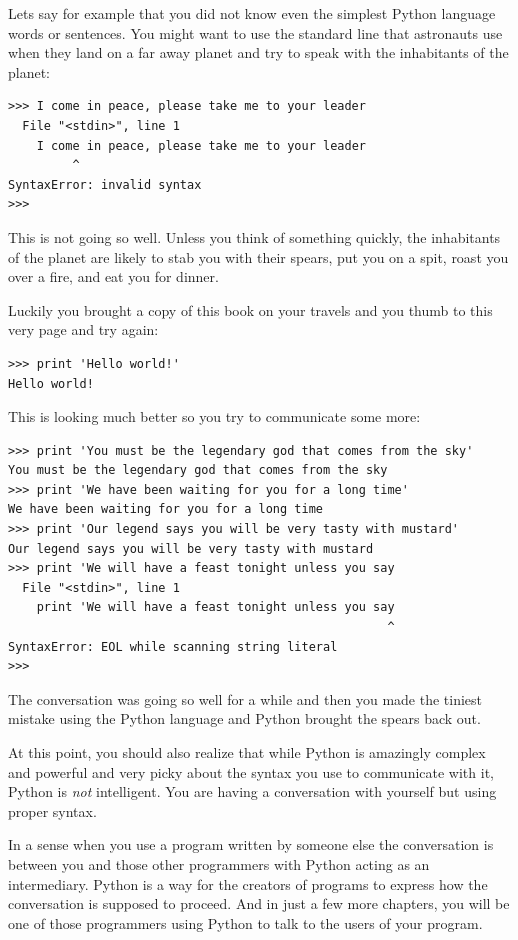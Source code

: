 \documentclass[11pt]{book}
\begin{document}
Lets say for example that you did not know even the simplest Python language
words or sentences. You might want to use the standard line that astronauts 
use when they land on a far away planet and try to speak with the inhabitants
of the planet:

\beforeverb
\begin{verbatim}
>>> I come in peace, please take me to your leader
  File "<stdin>", line 1
    I come in peace, please take me to your leader
         ^
SyntaxError: invalid syntax
>>> 
\end{verbatim}
\afterverb
%
This is not going so well.  Unless you think of something quickly,
the inhabitants of the planet are likely to stab you with their spears, 
put you on a spit, roast you over a fire, and eat you for dinner.

Luckily you brought a copy of this book on your travels and you thumb to
this very page and try again:

\beforeverb
\begin{verbatim}
>>> print 'Hello world!'
Hello world!
\end{verbatim}
\afterverb
%
This is looking much better so you try to communicate some
more:

\beforeverb
\begin{verbatim}
>>> print 'You must be the legendary god that comes from the sky'
You must be the legendary god that comes from the sky
>>> print 'We have been waiting for you for a long time'
We have been waiting for you for a long time
>>> print 'Our legend says you will be very tasty with mustard'
Our legend says you will be very tasty with mustard
>>> print 'We will have a feast tonight unless you say
  File "<stdin>", line 1
    print 'We will have a feast tonight unless you say
                                                     ^
SyntaxError: EOL while scanning string literal
>>> 
\end{verbatim}
\afterverb
%
The conversation was going so well for a while and then you
made the tiniest mistake using the Python language and Python 
brought the spears back out.

At this point, you should also realize that while Python 
is amazingly complex and powerful and very picky about 
the syntax you use to communicate with it, Python is {\em 
not} intelligent.  You are having a conversation with 
yourself but using proper syntax.

In a sense when you use a program written by someone else
the conversation is between you and those other
programmers with Python acting as an intermediary.  Python
is a way for the creators of programs to express how the 
conversation is supposed to proceed.  And
in just a few more chapters, you will be one of those
programmers using Python to talk to the users of your program.
\end{document}
